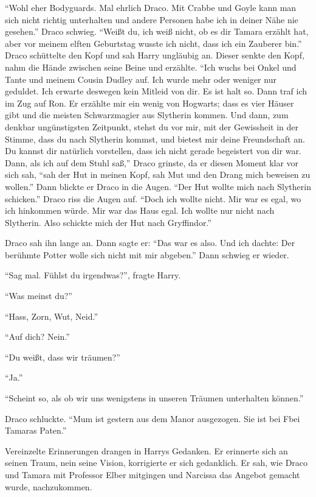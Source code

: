 \enquote{Wohl eher Bodyguards. Mal ehrlich Draco. Mit Crabbe und Goyle kann man sich nicht richtig unterhalten und andere Personen habe ich in deiner Nähe nie gesehen.} Draco schwieg. \enquote{Weißt du, ich weiß nicht, ob es dir Tamara erzählt hat, aber vor meinem elften Geburtstag wusste ich nicht, dass ich ein Zauberer bin.} Draco schüttelte den Kopf und sah Harry ungläubig an. Dieser senkte den Kopf, nahm die Hände zwischen seine Beine und erzählte. \enquote{Ich wuchs bei Onkel und Tante und meinem Cousin Dudley auf. Ich wurde mehr oder weniger nur geduldet. Ich erwarte deswegen kein Mitleid von dir. Es ist halt so. Dann traf ich im Zug auf Ron. Er erzählte mir ein wenig von Hogwarts; dass es vier Häuser gibt und die meisten Schwarzmagier aus Slytherin kommen. Und dann, zum denkbar ungünstigsten Zeitpunkt, stehst du vor mir, mit der Gewissheit in der Stimme, dass du nach Slytherin kommst, und bietest mir deine Freundschaft an. Du kannst dir natürlich vorstellen, dass ich nicht gerade begeistert von dir war. Dann, als ich auf dem Stuhl saß,\aabs} Draco grinste, da er diesen Moment klar vor sich sah, \enquote{\aabs sah der Hut in meinen Kopf, sah Mut und den Drang mich beweisen zu wollen.} Dann blickte er Draco in die Augen. \enquote{Der Hut wollte mich nach Slytherin schicken.} Draco riss die Augen auf. \enquote{Doch ich wollte nicht. Mir war es egal, wo ich hinkommen würde. Mir war das Haus egal. Ich wollte nur nicht nach Slytherin. \gst Also schickte mich der Hut nach Gryffindor.}

Draco sah ihn lange an. Dann sagte er: \enquote{Das war es also. Und ich dachte: Der berühmte Potter wolle sich nicht mit mir abgeben.} Dann schwieg er wieder.

\enquote{Sag mal. Fühlst du irgendwas?}, fragte Harry.

\enquote{Was meinst du?}

\enquote{Hass, Zorn, Wut, Neid.}

\enquote{Auf dich? Nein.}

\enquote{Du weißt, dass wir träumen?}

\enquote{Ja.}

\enquote{Scheint so, als ob wir uns wenigstens in unseren Träumen unterhalten können.}

Draco schluckte. \enquote{Mum ist gestern aus dem Manor ausgezogen. Sie ist bei F\aabs bei Tamaras Paten.}

Vereinzelte Erinnerungen drangen in Harrys Gedanken. Er erinnerte sich an seinen Traum, nein seine Vision, korrigierte er sich gedanklich. Er sah, wie Draco und Tamara mit Professor Elber mitgingen und Narcissa das Angebot gemacht wurde, nachzukommen.

